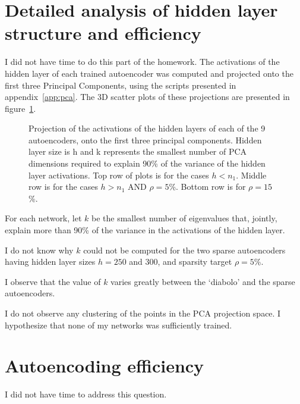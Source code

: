 \documentclass{article}
\begin{document}
\section{Detailed analysis of hidden layer structure and efficiency}
I did not have time to do this part of the homework.
{\color{blue}The activations of the hidden layer of each trained autoencoder was computed and projected onto the first three Principal Components, using the scripts presented in appendix~\ref{app:pca}. The 3D scatter plots of these projections are presented in figure~\ref{fig:pca}.}
\begin{figure}[bth!]
\centering
{}
\caption{{\color{blue}Projection of the activations of the hidden layers of each of the 9 autoencoders, onto the first three principal components. Hidden layer size is h and k represents the smallest number of PCA dimensions required to explain 90\% of the variance of the hidden layer activations. Top row of plots is for the cases $h<n_1$. Middle row is for the cases $h>n_1$ AND $\rho=5$\%. Bottom row is for $\rho=15$\%.}}\label{fig:pca}
\end{figure}
{\color{blue}
For each network, let $k$ be the smallest number of eigenvalues that, jointly, explain more than 90\% of the variance in the activations of the hidden layer.

I do not know why $k$ could  not be computed for the two sparse autoencoders having hidden layer sizes $h=250$ and $300$, and sparsity target $\rho=5$\%.

I observe that the value of $k$ varies greatly between the `diabolo' and the sparse autoencoders. 

I do not observe any clustering of the points in the PCA projection space. I hypothesize that none of my networks was sufficiently trained.}
{\color{blue}
\section{Autoencoding efficiency}
I did not have time to address this question.}


\end{document}
